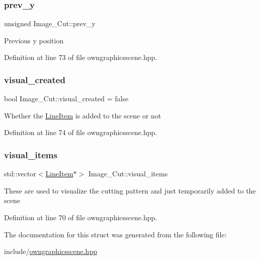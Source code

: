 \subsubsection{\texorpdfstring{prev\+\_\+y}{prev\_y}}
{\footnotesize\ttfamily unsigned Image\+\_\+\+Cut\+::prev\+\_\+y}

Previous y position 

Definition at line 73 of file owngraphicsscene.\+hpp.

\mbox{\label{structImage__Cut_acbae7507f135d85e9f2f9724fbc2a643}} 
\subsubsection{\texorpdfstring{visual\+\_\+created}{visual\_created}}
{\footnotesize\ttfamily bool Image\+\_\+\+Cut\+::visual\+\_\+created = false}

Whether the \mbox{\hyperlink{classLineItem}{Line\+Item}} is added to the scene or not 

Definition at line 74 of file owngraphicsscene.\+hpp.

\mbox{\label{structImage__Cut_ad56f1d72a3d7c5488fec27eaf5c6fbd9}} 
\subsubsection{\texorpdfstring{visual\+\_\+items}{visual\_items}}
{\footnotesize\ttfamily std\+::vector$<$\mbox{\hyperlink{classLineItem}{Line\+Item}}$\ast$$>$ Image\+\_\+\+Cut\+::visual\+\_\+items}

These are used to visualize the cutting pattern and just temporarily added to the scene 

Definition at line 70 of file owngraphicsscene.\+hpp.



The documentation for this struct was generated from the following file\+:\begin{DoxyCompactItemize}
\item 
include/\mbox{\hyperlink{owngraphicsscene_8hpp}{owngraphicsscene.\+hpp}}\end{DoxyCompactItemize}
